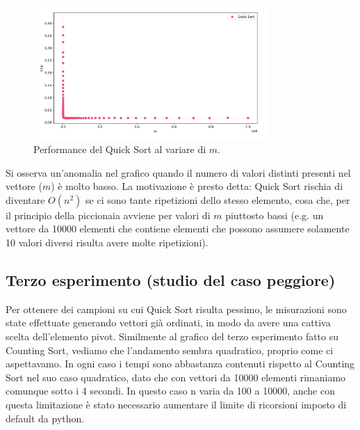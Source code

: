 \documentclass[a4paper, 12pt, oneside]{book}
\begin{document}
\begin{figure}[H]
    \centering
    \includegraphics[width=0.8\textwidth]{images/grafico_quick_sort_m.png}
    \caption{Performance del Quick Sort al variare di \(m\).}
    \label{fig:quick_sort_m}
\end{figure}

\noindent Si osserva un'anomalia nel grafico quando il numero di valori distinti presenti nel vettore (\(m\)) è molto basso. La motivazione è presto detta: Quick Sort rischia di diventare $O(n^2)$ se ci sono tante ripetizioni dello stesso elemento, cosa che, per il principio della piccionaia avviene per valori di $m$ piuttosto bassi (e.g. un vettore da 10000 elementi che contiene elementi che possono assumere solamente 10 valori diversi risulta avere molte ripetizioni).

\subsection{Terzo esperimento (studio del caso peggiore)}

Per ottenere dei campioni su cui Quick Sort risulta pessimo, le misurazioni sono state effettuate generando vettori già ordinati, in modo da avere una cattiva scelta dell'elemento pivot. Similmente al grafico del terzo esperimento fatto su Counting Sort, vediamo che l'andamento sembra quadratico, proprio come ci aspettavamo. In ogni caso i tempi sono abbastanza contenuti rispetto al Counting Sort nel suo caso quadratico, dato che con vettori da 10000 elementi rimaniamo comunque sotto i 4 secondi. In questo caso n varia da 100 a 10000, anche con questa limitazione è stato necessario aumentare il limite di ricorsioni imposto di default da python.
\end{document}
